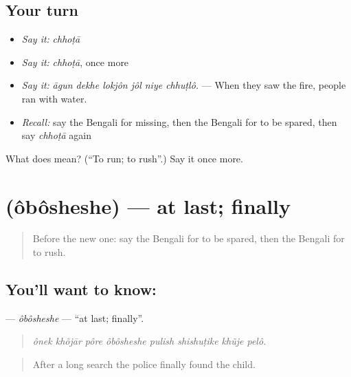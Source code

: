 \subsection*{Your turn}
\begin{itemize}
\raggedright
  \item \emph{Say it:} \emph{chhoṭā}
  \item \emph{Say it:} \emph{chhoṭā}, once more
  \item \emph{Say it:} \emph{āgun dekhe lokjôn jôl niye chhuṭlô.} — When they saw the fire, people ran with water.
  \item \emph{Recall:} say the Bengali for missing, then the Bengali for to be spared, then say \emph{chhoṭā} again
\end{itemize}

\begin{tcolorbox}[breakable,colback=teal!4,colframe=teal!35!black,title={Before you move on}]
What does  mean? (\textquotedblleft{}To run; to rush\textquotedblright{}.) Say it once more.
\end{tcolorbox}
\section[\texorpdfstring{\bn{অবশেষে} (ôbôsheshe)}{অবশেষে (ôbôsheshe)}]{ (ôbôsheshe) — at last; finally}

\label{lesson:BN-C281-obosheshe}



\begin{quote}
Before the new one: say the Bengali for to be spared, then the Bengali for to rush.
\end{quote}

\subsection*{You'll want to know: }
\textbf{} — \emph{ôbôsheshe} — \textquotedblleft{}at last; finally\textquotedblright{}.

\begin{quote}
       
\end{quote}

\begin{quote}
\emph{ônek khõjār pôre ôbôsheshe pulish shishuṭike khũje pelô.}
\end{quote}

\begin{quote}
After a long search the police finally found the child.
\end{quote}

